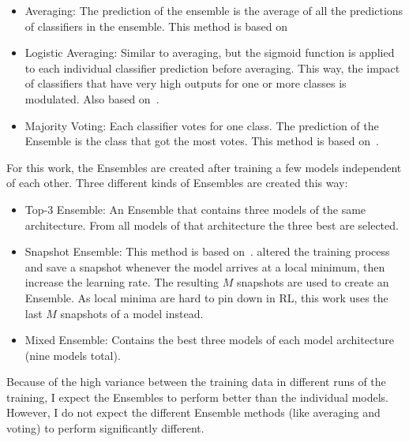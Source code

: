 \begin{itemize}
	\item Averaging: The prediction of the ensemble is the average of all the predictions of classifiers in the ensemble. This method is based on~\parencite{ismail_fawaz_deep_2019}
	\item Logistic Averaging: Similar to averaging, but the sigmoid function is applied to each individual classifier prediction before averaging. This way, the impact of classifiers that have very high outputs for one or more classes is modulated. Also based on~\parencite{ismail_fawaz_deep_2019}.
	\item Majority Voting: Each classifier votes for one class. The prediction of the Ensemble is the class that got the most votes. This method is based on~\parencite{littlestone_weighted_1994}.
\end{itemize}

For this work, the Ensembles are created after training a few models independent of each other. Three different kinds of Ensembles are created this way:

\begin{itemize}
	\item Top-3 Ensemble: An Ensemble that contains three models of the same architecture. From all models of that architecture the three best are selected.
	\item Snapshot Ensemble: This method is based on~\parencite{huang_snapshot_2017}. \textcite{huang_snapshot_2017} altered the training process and save a snapshot whenever the model arrives at a local minimum, then increase the learning rate. The resulting $M$ snapshots are used to create an Ensemble. As local minima are hard to pin down in RL, this work uses the last $M$ snapshots of a model instead.
	\item Mixed Ensemble: Contains the best three models of each model architecture (nine models total).
\end{itemize}

Because of the high variance between the training data in different runs of the training, I expect the Ensembles to perform better than the individual models. However, I do not expect the different Ensemble methods (like averaging and voting) to perform significantly different.

